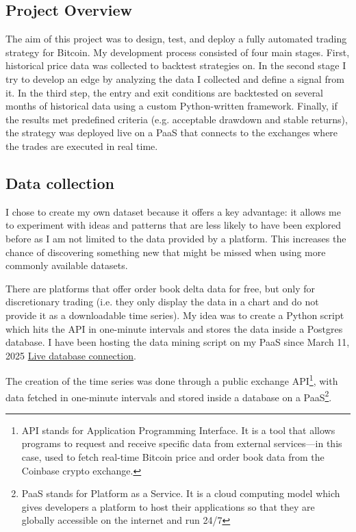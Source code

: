 \documentclass[12pt]{article}
\begin{document}
\subsection*{Project Overview}
The aim of this project was to design, test, and deploy a fully automated trading strategy for Bitcoin.
My development process consisted of four main stages. First, historical price data was collected to backtest strategies on.
In the second stage I try to develop an edge by analyzing the data I collected and define a signal from it.
In the third step, the entry and exit conditions are backtested on several months of historical data using a custom Python-written framework. Finally, if the results met predefined criteria (e.g. acceptable drawdown and stable returns), the strategy was deployed live on a PaaS that connects to the exchanges where the trades are executed in real time.

\subsection*{Data collection}



I chose to create my own dataset because it offers a key advantage: it allows me to experiment with ideas and patterns that are less likely to have been explored before as I am not limited to the data provided by a platform. 
This increases the chance of discovering something new that might be missed when using more commonly available datasets.

There are platforms that offer order book delta data for free, but only for discretionary trading (i.e. they only display the data in a chart and do not provide it as a downloadable time series). My idea was to create a Python script which hits the API in one-minute intervals and stores the data inside a Postgres database. I have been hosting the data mining script on my PaaS since March 11, 2025 \href{https://customchart-production.up.railway.app/#}{Live database connection}.

The creation of the time series was done through a public exchange API\footnote[1]{API stands for Application Programming Interface. It is a tool that allows programs to request and receive specific data from external services—in this case, used to fetch real-time Bitcoin price and order book data from the Coinbase crypto exchange.}, with data fetched in one-minute intervals and stored inside a database on a PaaS\footnote[2]{PaaS stands for Platform as a Service. It is a cloud computing model which gives developers a platform to host their applications so that they are globally accessible on the internet and run 24/7}.
\end{document}
